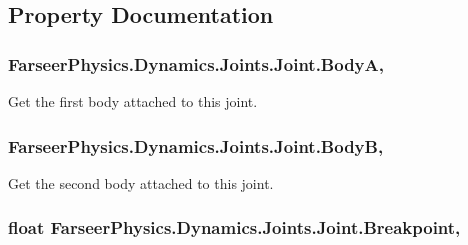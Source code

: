\subsection{Property Documentation}
\hypertarget{class_farseer_physics_1_1_dynamics_1_1_joints_1_1_joint_a37bb538e0112f8536d86e352b4f1d4bc}{
\subsubsection[{Body\+A}]{ Farseer\+Physics.\+Dynamics.\+Joints.\+Joint.\+Body\+A\hspace{0.3cm}{\ttfamily [get]}, {\ttfamily [set]}}}\label{class_farseer_physics_1_1_dynamics_1_1_joints_1_1_joint_a37bb538e0112f8536d86e352b4f1d4bc}


Get the first body attached to this joint. 

\hypertarget{class_farseer_physics_1_1_dynamics_1_1_joints_1_1_joint_a9889e8bfcb93d07f36e67404dadf30fa}{
\subsubsection[{Body\+B}]{ Farseer\+Physics.\+Dynamics.\+Joints.\+Joint.\+Body\+B\hspace{0.3cm}{\ttfamily [get]}, {\ttfamily [set]}}}\label{class_farseer_physics_1_1_dynamics_1_1_joints_1_1_joint_a9889e8bfcb93d07f36e67404dadf30fa}


Get the second body attached to this joint. 

\hypertarget{class_farseer_physics_1_1_dynamics_1_1_joints_1_1_joint_a78584756db5015f83e5c5f54e132f634}{
\subsubsection[{Breakpoint}]{\setlength{\rightskip}{0pt plus 5cm}float Farseer\+Physics.\+Dynamics.\+Joints.\+Joint.\+Breakpoint\hspace{0.3cm}{\ttfamily [get]}, {\ttfamily [set]}}}\label{class_farseer_physics_1_1_dynamics_1_1_joints_1_1_joint_a78584756db5015f83e5c5f54e132f634}


